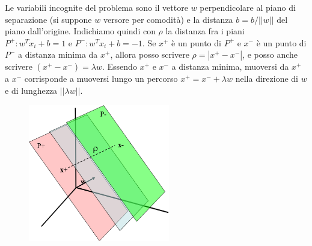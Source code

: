 \documentclass[a4paper,oneside,titlepage]{book}
\begin{document}
Le variabili incognite del problema sono il vettore $w$ perpendicolare al piano di separazione (si suppone $w$ versore per comodità) e la distanza $b=b/||w||$ del piano dall'origine. Indichiamo quindi con $\rho$ la distanza fra i piani $P^+: w^T x_i + b = 1$ e $P^-: w^T x_i + b = -1$. Se $x^+$ è un punto di $P^+$ e $x^-$ è un punto di $P^-$ a distanza minima da $x^+$, allora posso scrivere $\rho = |x^+ - x^-|$, e posso anche scrivere $(x^+ - x^-) = \lambda w$. Essendo $x^+$ e $x^-$ a distanza minima, muoversi da $x^+$ a $x^-$ corrisponde a muoversi lungo un percorso $x^+ = x^- + \lambda w$ nella direzione di $w$ e di lunghezza $||\lambda w||$.
\begin{figure}[htp]
	\centering
	\includegraphics[width=0.55\textwidth]{svm5.png}
\end{figure}
\end{document}
